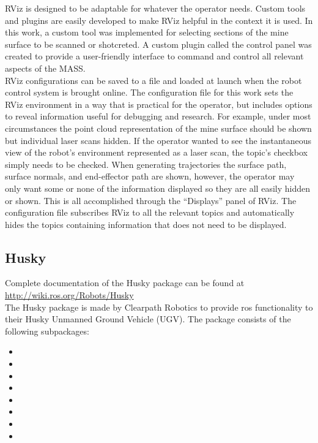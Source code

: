 RViz is designed to be adaptable for whatever the operator needs. Custom tools and plugins are easily developed to make RViz helpful in the context it is used. In this work, a custom tool was implemented for selecting sections of the mine surface to be scanned or shotcreted. A custom plugin called the control panel was created to provide a user-friendly interface to command and control all relevant aspects of the MASS.\\

RViz configurations can be saved to a file and loaded at launch when the robot control system is brought online. The configuration file for this work sets the RViz environment in a way that is practical for the operator, but includes options to reveal information useful for debugging and research. For example, under most circumstances the point cloud representation of the mine surface should be shown but individual laser scans hidden. If the operator wanted to see the instantaneous view of the robot's environment represented as a laser scan, the topic's checkbox simply needs to be checked. When generating trajectories the surface path, surface normals, and end-effector path are shown, however, the operator may only want some or none of the information displayed so they are all easily hidden or shown. This is all accomplished through the ``Displays'' panel of RViz. The configuration file subscribes RViz to all the relevant topics and automatically hides the topics containing information that does not need to be displayed.\\

\subsection{Husky}

Complete documentation of the Husky package can be found at \url{http://wiki.ros.org/Robots/Husky}\\

The Husky package is made by Clearpath Robotics to provide \acrshort{ros} functionality to their Husky Unmanned Ground Vehicle (UGV). The package consists of the following subpackages:

\begin{itemize}
    \item {}
    \item {}
    \item {}
    \item {}
    \item {}
    \item {}
    \item {}
    \item {}
\end{itemize}

